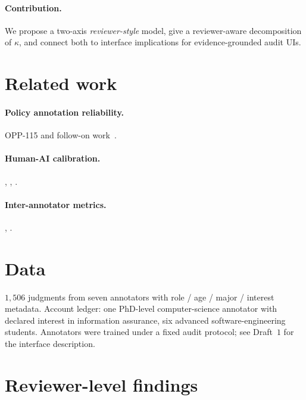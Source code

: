 \documentclass[11pt,a4paper]{article}
\begin{document}
\paragraph{Contribution.}
We propose a two-axis \emph{reviewer-style} model, give a
reviewer-aware decomposition of $\kappa$, and connect both to interface
implications for evidence-grounded audit UIs.

\section{Related work}
\paragraph{Policy annotation reliability.} OPP-115 and follow-on
work~\citep{wilson2016creation,sathyendra2017identifying,bhatia2016theory}.
\paragraph{Human-AI calibration.} \citet{amershi2019guidelines},
\citet{cai2019hello}, \citet{liao2020questioning}.
\paragraph{Inter-annotator metrics.} \citet{cohen1960coefficient},
\citet{landis1977measurement}.

\section{Data}
$1{,}506$ judgments from seven annotators with role / age / major /
interest metadata. Account ledger: one PhD-level computer-science
annotator with declared interest in information assurance, six advanced
software-engineering students. Annotators were trained under a fixed
audit protocol; see Draft~$1$ for the interface description.

\section{Reviewer-level findings}
\end{document}
